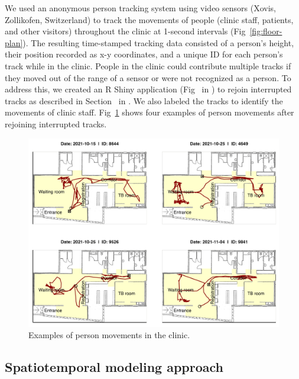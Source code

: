 \documentclass[fleqn,11pt]{wlscirep}
\begin{document}
We used an anonymous person tracking system using video sensors (Xovis, Zollikofen, Switzerland) to track the movements of people (clinic staff, patients, and other visitors) throughout the clinic at 1-second intervals (Fig~\ref{fig:floor-plan}). The resulting time-stamped tracking data consisted of a person’s height, their position recorded as x-y coordinates, and a unique ID for each person's track while in the clinic. People in the clinic could contribute multiple tracks if they moved out of the range of a sensor or were not recognized as a person. To address this, we created an R Shiny application (Fig~ in \supp) to rejoin interrupted tracks as described in Section~ in \supp. We also labeled the tracks to identify the movements of clinic staff. Fig~\ref{fig:tracking-examples} shows four examples of person movements after rejoining interrupted tracks.  

\begin{figure}[!htpb]
    \centering
    \includegraphics{results/data/example-patient-tracks.png}
    \caption{Examples of person movements in the clinic.}
    \label{fig:tracking-examples}
\end{figure}


\subsection*{Spatiotemporal modeling approach}
\end{document}

